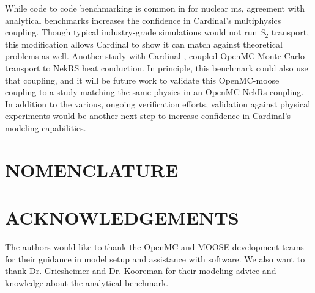 \documentclass[letterpaper]{mc2023}
\begin{document}
While code to code benchmarking is common in for nuclear \gls{ms}, agreement with analytical benchmarks increases the confidence in Cardinal's
multiphysics coupling. Though typical industry-grade simulations would not run $S_{2}$ transport, this modification allows Cardinal to show it can
match against theoretical problems as well. Another study with Cardinal \cite{novak-2023}, coupled OpenMC Monte Carlo transport to NekRS heat conduction.
In principle, this benchmark could also use that coupling, and it will be future work to validate this OpenMC-\gls{moose} coupling to a study matching
the same physics in an OpenMC-NekRs coupling. In addition to the various, ongoing verification efforts, validation against physical experiments would be
another next step to increase confidence in Cardinal's modeling capabilities.
\section*{NOMENCLATURE}

\printglossary[title={Nomenclature}, nonumberlist, nopostdot]

\section*{ACKNOWLEDGEMENTS}
The authors would like to thank the OpenMC and MOOSE development teams for their guidance in model setup and assistance
with software. We also want to thank Dr. Griesheimer and Dr. Kooreman for their modeling advice and knowledge about the
analytical benchmark.

\setlength{\baselineskip}{12pt}


\setlength{\baselineskip}{12pt}
\end{document}
